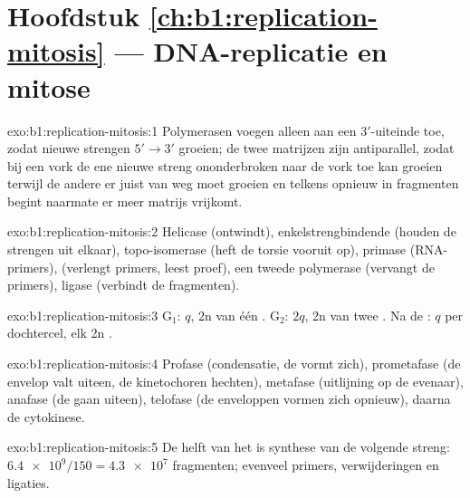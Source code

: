 \section*{Hoofdstuk \ref{ch:b1:replication-mitosis} --- DNA-replicatie en mitose}

\begin{solution}{exo:b1:replication-mitosis:1}
Polymerasen voegen  alleen aan een $3'$-uiteinde toe, zodat nieuwe
strengen $5' \to 3'$ groeien; de twee matrijzen zijn antiparallel, zodat bij een
vork de ene nieuwe streng ononderbroken naar de vork toe kan groeien terwijl de
andere er juist van weg moet groeien en telkens opnieuw in fragmenten begint
naarmate er meer matrijs vrijkomt.
\end{solution}

\begin{solution}{exo:b1:replication-mitosis:2}
Helicase (ontwindt), enkelstrengbindende  (houden de strengen uit elkaar),
topo-isomerase (heft de torsie vooruit op), primase (RNA-primers), 
(verlengt primers, leest proef), een tweede polymerase (vervangt de primers),
ligase (verbindt de fragmenten).
\end{solution}

\begin{solution}{exo:b1:replication-mitosis:3}
G$_1$: $q$, 2n  van één . G$_2$: $2q$, 2n  van
twee . Na de : $q$ per dochtercel, elk 2n .
\end{solution}

\begin{solution}{exo:b1:replication-mitosis:4}
Profase (condensatie, de  vormt zich), prometafase (de envelop valt
uiteen, de kinetochoren hechten), metafase (uitlijning op de evenaar), anafase (de
 gaan uiteen), telofase (de enveloppen vormen zich opnieuw), daarna de
cytokinese.
\end{solution}

\begin{solution}{exo:b1:replication-mitosis:5}
De helft van het  is synthese van de volgende streng: $\num{6.4e9}/150 =
\num{4.3e7}$ fragmenten; evenveel primers, verwijderingen en ligaties.
\end{solution}


